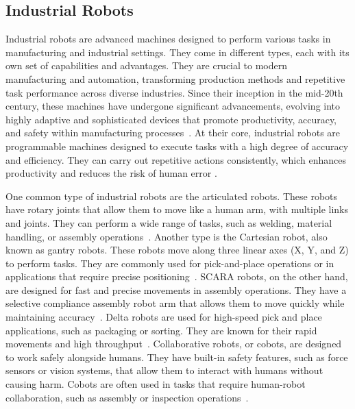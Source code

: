 \subsection{Industrial Robots}\label{IR}
Industrial robots are advanced machines designed to perform various tasks in manufacturing and industrial settings. They come in different types, each with its own set of capabilities and advantages. They are crucial to modern manufacturing and automation, transforming production methods and repetitive task performance across diverse industries. Since their inception in the mid-20th century, these machines have undergone significant advancements, evolving into highly adaptive and sophisticated devices that promote productivity, accuracy, and safety within manufacturing processes~\cite{Ji.2019}.
At their core, industrial robots are programmable machines designed to execute tasks with a high degree of accuracy and efficiency. They can carry out repetitive actions consistently, which enhances productivity and reduces the risk of human error \cite{Siciliano.2016}. 



One common type of industrial robots are the articulated robots. These robots have rotary joints that allow them to move like a human arm, with multiple links and joints. They can perform a wide range of tasks, such as welding, material handling, or assembly operations~\cite{Hanafusa.1981, Jain.2019}. Another type is the Cartesian robot, also known as gantry robots. These robots move along three linear axes (X, Y, and Z) to perform tasks. They are commonly used for pick-and-place operations or in applications that require precise positioning~\cite{Kim.2003}. SCARA robots, on the other hand, are designed for fast and precise movements in assembly operations. They have a selective compliance assembly robot arm that allows them to move quickly while maintaining accuracy~\cite{Das.2005}. Delta robots are used for high-speed pick and place applications, such as packaging or sorting. They are known for their rapid movements and high throughput~\cite{bonev2001delta}. Collaborative robots, or cobots, are designed to work safely alongside humans. They have built-in safety features, such as force sensors or vision systems, that allow them to interact with humans without causing harm. Cobots are often used in tasks that require human-robot collaboration, such as assembly or inspection operations~\cite{Liu.2022b}.


